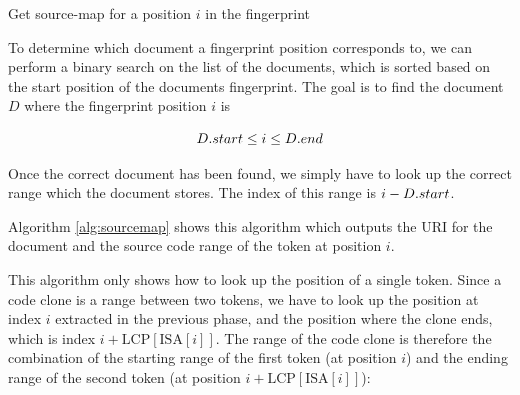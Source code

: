 \begin{algorithm}[t]
  \SetAlgoLined\DontPrintSemicolon

  \vspace{0.5cm}
  \caption{Get source-map for a position $i$ in the fingerprint}
  \label{alg:sourcemap}
\end{algorithm}

To determine which document a fingerprint position corresponds to, we can perform a binary
search on the list of the documents, which is sorted based on the start position of the
documents fingerprint. The goal is to find the document $D$ where the fingerprint position $i$
is 

$$
{{D}.{start}} \leq i \leq {{D}.{end}}
$$

Once the correct document has been found, we simply have to look up the correct range
which the document stores. The index of this range is $i -
{{D}.{start}}$.

Algorithm \ref{alg:sourcemap} shows this algorithm which outputs the URI for the document and
the source code range of the token at position $i$.

This algorithm only shows how to look up the position of a single token. Since a code
clone is a range between two tokens, we have to look up the position at index $i$
extracted in the previous phase, and the position where the clone ends, which is index $i
+ \text{LCP}[\text{ISA}[i]]$. The range of the code clone is therefore the combination of
the starting range of the first token (at position $i$) and the ending range of the second
token (at position $i + \text{LCP}[\text{ISA}[i]]$):

